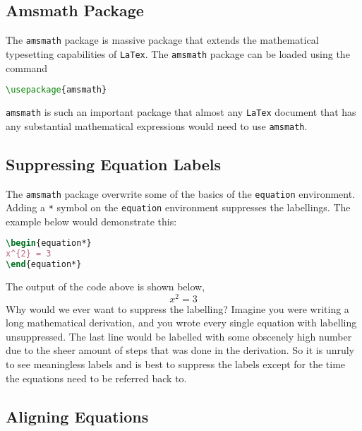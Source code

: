 \documentclass[a4paper, 12pt]{report}
\begin{document}
\begin{center}
\section{Amsmath Package}
\begin{comment}
\end{comment}
The \texttt{amsmath} package is massive package that extends the mathematical typesetting capabilities of \texttt{LaTex}. The \texttt{amsmath} package can be loaded using the command
\begin{lstlisting}[language=tex]
\usepackage{amsmath}
\end{lstlisting}
\texttt{amsmath} is such an important package that almost any \texttt{LaTex} document that has any substantial mathematical expressions would need to use \texttt{amsmath}.

\subsection{Suppressing Equation Labels}
\begin{comment}
\end{comment}

The \texttt{amsmath} package overwrite some of the basics of the \texttt{equation} environment. Adding a \texttt{*} symbol on the \texttt{equation} environment suppresses the labellings. The example below would demonstrate this:
\begin{lstlisting}[language=tex]
\begin{equation*}
x^{2} = 3
\end{equation*}
\end{lstlisting}
The output of the code above is shown below,
\begin{equation*}
x^{2} = 3
\end{equation*}
Why would we ever want to suppress the labelling? Imagine you were writing a long mathematical derivation, and you wrote every single equation with labelling unsuppressed. The last line would be labelled with some obscenely high number due to the sheer amount of steps that was done in the derivation. So it is unruly to see meaningless labels and is best to suppress the labels except for the time the equations need to be referred back to. 

\subsection{Aligning Equations}
\begin{comment}
\end{comment}


\end{center}
\end{document}
